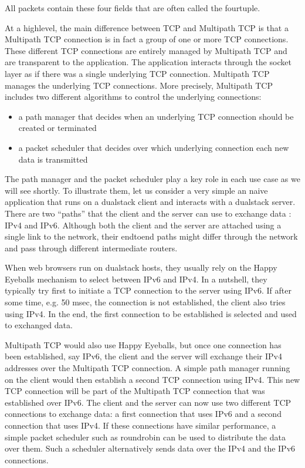 \documentclass[letterpaper,10pt,english]{sphinxmanual}
\begin{document}
\sphinxAtStartPar
All packets contain these four fields that are often called the four\sphinxhyphen{}tuple.

\sphinxAtStartPar
At a high\sphinxhyphen{}level, the main difference between TCP and Multipath TCP is that a Multipath TCP connection is in fact a group of one or more TCP connections. These different TCP connections are entirely managed by Multipath TCP and are transparent to the application. The application interacts through the socket layer as if there was a single underlying TCP connection. Multipath TCP manages the underlying TCP connections. More precisely, Multipath TCP includes two different algorithms to control the underlying connections:
\begin{itemize}
\item {} 
\sphinxAtStartPar
a path manager that decides when an underlying TCP connection should be created or terminated

\item {} 
\sphinxAtStartPar
a packet scheduler that decides over which underlying connection each new data is transmitted

\end{itemize}

\sphinxAtStartPar
The path manager and the packet scheduler play a key role in each use case as we will see shortly. To illustrate them, let us consider a very simple an naive application that runs on a dual\sphinxhyphen{}stack client and interacts with a dual\sphinxhyphen{}stack server. There are two “paths” that the client and the server can use to exchange data : IPv4 and IPv6. Although both the client and the server are attached using a single link to the network, their end\sphinxhyphen{}to\sphinxhyphen{}end paths might differ through the network and pass through different intermediate routers.

\sphinxAtStartPar
When web browsers run on dual\sphinxhyphen{}stack hosts, they usually rely on the Happy Eyeballs mechanism to select between IPv6 and IPv4. In a nutshell, they typically try first to initiate a TCP connection to the server using IPv6. If after some time, e.g. 50 msec, the connection is not established, the client also tries using IPv4. In the end, the first connection to be established is selected and used to exchanged data.

\sphinxAtStartPar
Multipath TCP would also use Happy Eyeballs, but once one connection has been established, say IPv6, the client and the server will exchange their IPv4 addresses over the Multipath TCP connection. A simple path manager running on the client would then establish a second TCP connection using IPv4. This new TCP connection will be part of the Multipath TCP connection that was established over IPv6. The client and the server can now use two different TCP connections to exchange data: a first connection that uses IPv6 and a second connection that uses IPv4. If these connections have similar performance, a simple packet scheduler such as round\sphinxhyphen{}robin can be used to distribute the data over them. Such a scheduler alternatively sends data over the IPv4 and the IPv6 connections.
\end{document}
